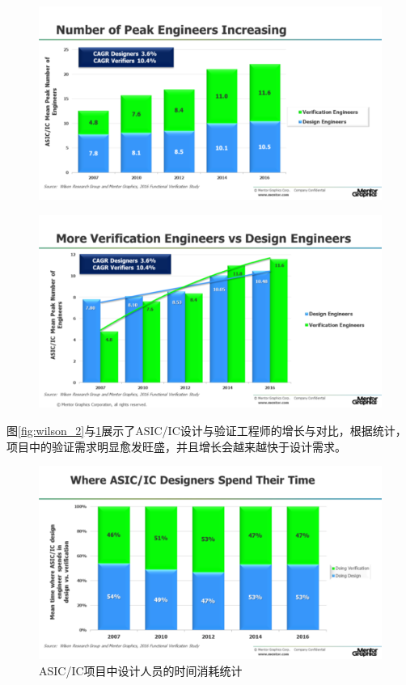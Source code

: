 \documentclass[a4paper,11pt]{article}
\begin{document}
\begin{figure}
\centering
\begin{minipage}[t]{.5\textwidth}
  \centering
  \includegraphics[width=0.95\linewidth]{images/wilson2.png}
  \label{fig:wilson_2}
\end{minipage}%
\begin{minipage}[t]{.5\textwidth}
  \centering
  \includegraphics[width=0.95\linewidth]{images/wilson3.png}
  \label{fig:wilson_3}
\end{minipage}
\end{figure}

图\ref{fig:wilson_2}与\ref{fig:wilson_3}展示了ASIC/IC设计与验证工程师的增长与对比，根据统计，项目中的验证需求明显愈发旺盛，并且增长会越来越快于设计需求。

\begin{figure}[ht]
  \centering
  \includegraphics[width=0.8\linewidth]{images/wilson4.png}
  \caption{ASIC/IC项目中设计人员的时间消耗统计}
  \label{fig:wilson_4}
\end{figure}
\end{document}
